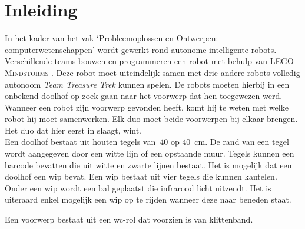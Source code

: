 \documentclass[eind]{penoverslag}
\begin{document}
\newpage
\setcounter{tocdepth}{3}
\tableofcontents
\newpage

\section{Inleiding} %
\label{ssec:Inl}
In het kader van het vak `Probleemoplossen en Ontwerpen: computerwetenschappen' wordt gewerkt rond autonome intelligente robots. Verschillende teams bouwen en programmeren een robot met behulp van \textsc{LEGO Mindstorms} \cite{mindstorms}. Deze robot moet uiteindelijk samen met drie andere robots volledig autonoom \textit{Team Treasure Trek} kunnen spelen.
De robots moeten hierbij in een onbekend doolhof op zoek gaan naar het voorwerp dat hen toegewezen werd. Wanneer een robot zijn voorwerp gevonden heeft, komt hij te weten met welke robot hij moet samenwerken. Elk duo moet beide voorwerpen bij elkaar brengen. Het duo dat hier eerst in slaagt, wint.\\

Een doolhof bestaat uit houten tegels van~$40$ op $40$~cm. De rand van een tegel wordt aangegeven door een witte lijn of een opstaande muur. Tegels kunnen een barcode bevatten die uit witte en zwarte lijnen bestaat. Het is mogelijk dat een doolhof een wip bevat. Een wip bestaat uit vier tegels die kunnen kantelen. Onder een wip wordt een bal geplaatst die infrarood licht uitzendt. Het is uiteraard enkel mogelijk een wip op te rijden wanneer deze naar beneden staat.

Een voorwerp bestaat uit een wc-rol dat voorzien is van klittenband.\\

%
%
\end{document}

